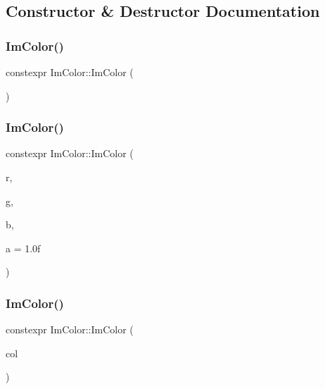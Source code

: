 \subsection{Constructor \& Destructor Documentation}
\mbox{\label{structImColor_afcac85caf0653c8c73048b79f98a1933}} 
\subsubsection{\texorpdfstring{Im\+Color()}{ImColor()}\hspace{0.1cm}{\footnotesize\ttfamily [1/5]}}
{\footnotesize\ttfamily constexpr Im\+Color\+::\+Im\+Color (\begin{DoxyParamCaption}{ }\end{DoxyParamCaption})\hspace{0.3cm}{\ttfamily [inline]}}

\mbox{\label{structImColor_af43ef7c778b4eb6cd43285379026929b}} 
\subsubsection{\texorpdfstring{Im\+Color()}{ImColor()}\hspace{0.1cm}{\footnotesize\ttfamily [2/5]}}
{\footnotesize\ttfamily constexpr Im\+Color\+::\+Im\+Color (\begin{DoxyParamCaption}\item[{float}]{r,  }\item[{float}]{g,  }\item[{float}]{b,  }\item[{float}]{a = {\ttfamily 1.0f} }\end{DoxyParamCaption})\hspace{0.3cm}{\ttfamily [inline]}}

\mbox{\label{structImColor_ab013c0baa756972b6ad5c01b8f3159ab}} 
\subsubsection{\texorpdfstring{Im\+Color()}{ImColor()}\hspace{0.1cm}{\footnotesize\ttfamily [3/5]}}
{\footnotesize\ttfamily constexpr Im\+Color\+::\+Im\+Color (\begin{DoxyParamCaption}\item[{const \hyperlink{structImVec4}{Im\+Vec4} \&}]{col }\end{DoxyParamCaption})\hspace{0.3cm}{\ttfamily [inline]}}

